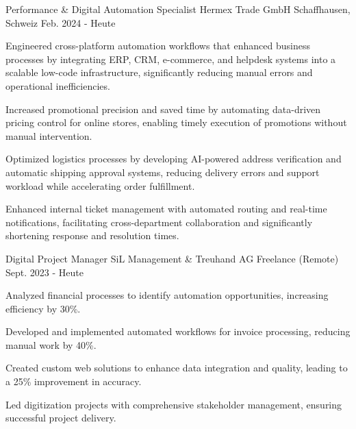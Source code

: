

\begin{cventries}
\cventry
  {Performance \& Digital Automation Specialist}
  {Hermex Trade GmbH}
  {Schaffhausen, Schweiz}
  {Feb. 2024 - Heute}
  {
    \begin{cvitems}
\item {Engineered cross-platform automation workflows that enhanced business processes by integrating ERP, CRM, e-commerce, and helpdesk systems into a scalable low-code infrastructure, significantly reducing manual errors and operational inefficiencies.}
\item {Increased promotional precision and saved time by automating data-driven pricing control for online stores, enabling timely execution of promotions without manual intervention.}
\item {Optimized logistics processes by developing AI-powered address verification and automatic shipping approval systems, reducing delivery errors and support workload while accelerating order fulfillment.}
\item {Enhanced internal ticket management with automated routing and real-time notifications, facilitating cross-department collaboration and significantly shortening response and resolution times.}
\end{cvitems}
  }

\cventry
  {Digital Project Manager}
  {SiL Management \& Treuhand AG}
  {Freelance (Remote)}
  {Sept. 2023 - Heute}
  {
    \begin{cvitems}
\item {Analyzed financial processes to identify automation opportunities, increasing efficiency by 30\%.}
\item {Developed and implemented automated workflows for invoice processing, reducing manual work by 40\%.}
\item {Created custom web solutions to enhance data integration and quality, leading to a 25\% improvement in accuracy.}
\item {Led digitization projects with comprehensive stakeholder management, ensuring successful project delivery.}
\end{cvitems}
  }


\end{cventries}
